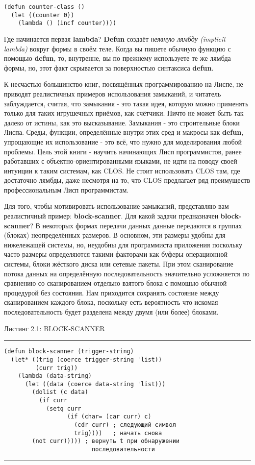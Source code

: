 \begin{verbatim}
(defun counter-class ()
  (let ((counter 0))
    (lambda () (incf counter))))
\end{verbatim}

Где начинается первая \textbf{lambda}? \textbf{Defun} создаёт \emph{неявную лямбду { (implicit lambda)}} вокруг формы в своём теле. Когда вы пишете обычную функцию с помощью \textbf{defun}, то, внутренне, вы по прежнему используете те же лямбда формы, но, этот факт скрывается за поверхностью синтаксиса \textbf{defun}.

К несчастью большинство книг, посвящённых программированию на Лиспе, не приводят реалистичных примеров использования замыканий, и читатель заблуждается, считая, что замыкания - это такая идея, которую можно применять только для таких игрушечных приёмов, как счётчики. Ничто не может быть так далеко от истины, как это высказывание. Замыкания - это строительные блоки Лиспа. Среды, функции, определённые внутри этих сред и макросы как \textbf{defun}, упрощающие их использование - это всё, что нужно для моделирования любой проблемы. Цель этой книги - научить начинающих Лисп программистов, ранее работавших с объектно-ориентированными языками, не идти на поводу своей интуиции к таким системам, как CLOS. Не стоит использовать CLOS там, где достаточно лямбды, даже несмотря на то, что CLOS предлагает ряд преимуществ профессиональным Лисп программистам.

Для того, чтобы мотивировать использование замыканий, представляю вам реалистичный пример: \textbf{block-scanner}. Для какой задачи предназначен \textbf{block-scanner}? В некоторых формах передачи данных данные передаются в группах (блоках) неопределённых размеров. В основном, эти размеры удобны для нижележащей системы, но, неудобны для программиста приложения поскольку часто размеры определяются такими факторами как буферы операционной системы, блоки жёсткого диска или сетевые пакеты. При этом сканирование потока данных на определённую последовательность значительно усложняется по сравнению со сканированием отдельно взятого блока с помощью обычной процедурой без состояния. Нам приходится сохранять состояние между сканированием каждого блока, поскольку есть вероятность что искомая последовательность будет разделена между двумя (или более) блоками.

Листинг 2.1: BLOCK-SCANNER\label{listing_2.1}
\hrule
\begin{verbatim}
(defun block-scanner (trigger-string)
  (let* ((trig (coerce trigger-string 'list))
         (curr trig))
    (lambda (data-string)
      (let ((data (coerce data-string 'list)))
        (dolist (c data)
          (if curr
            (setq curr
                  (if (char= (car curr) c)
                    (cdr curr) ; следующий символ
                    trig))))   ; начать снова
        (not curr))))) ; вернуть t при обнаружении
                         последовательности
\end{verbatim}
\hrule

